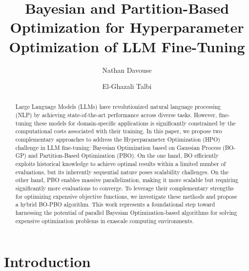 \documentclass[runningheads]{llncs}
\newcommand{\rev}[1]{{#1}}
\begin{document}
\title{\rev{Bayesian and Partition-Based Optimization for Hyperparameter Optimization of LLM Fine-Tuning}}

\author{Nathan Davouse \and
El-Ghazali Talbi 
}
%
%
%
\maketitle              %
%
\begin{abstract}

\rev{Large Language Models (LLMs) have revolutionized natural language processing (NLP) by achieving state-of-the-art performance across diverse tasks. However, fine-tuning these models for domain-specific applications is significantly constrained by the computational costs associated with their training. In this paper, we propose two complementary approaches to address the Hyperparameter Optimization (HPO) challenge in LLM fine-tuning: Bayesian Optimization based on Gaussian Process (BO-GP) and Partition-Based Optimization (PBO). On the one hand, BO efficiently exploits historical knowledge to achieve optimal results within a limited number of evaluations, but its inherently sequential nature poses scalability challenges. On the other hand, PBO enables massive parallelization, making it more scalable but requiring significantly more evaluations to converge. To leverage their complementary strengths for optimizing expensive objective functions, we investigate these methods and propose a hybrid BO-PBO algorithm. This work represents a foundational step toward harnessing the potential of parallel Bayesian Optimization-based algorithms for solving expensive optimization problems in exascale computing environments.}

\end{abstract}


\section{Introduction}
\label{sec:intro}
\end{document}
